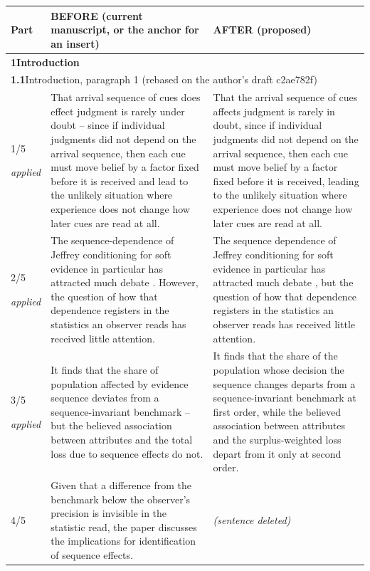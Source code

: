 \documentclass[10pt]{article}
\theoremstyle{definition}
\newcommand{\entryhead}[2]{\multicolumn{3}{|l|}{\rule{0pt}{2.6ex}\large\textbf{#1}\quad #2} \\ \hline}
\begin{document}
{\small
\begin{longtable}{|p{0.9cm}|p{12.2cm}|p{12.2cm}|}
\hline
\textbf{Part} & \textbf{BEFORE (current manuscript, or the anchor for an insert)} & \textbf{AFTER (proposed)} \\ \hline\hline
\endhead
\multicolumn{3}{|l|}{\rule{0pt}{3.2ex}\Large\textbf{1\quad Introduction}} \\ \hline\hline
\entryhead{1.1}{Introduction, paragraph 1 (rebased on the author's draft c2ae782f)\quad{\footnotesize\textit{(formerly C.2)}}}
1/5 \par{\tiny\textit{applied}} & That arrival sequence of cues does effect judgment is rarely under doubt -- since if individual judgments did not depend on the arrival sequence, then each cue must move belief by a factor fixed before it is received and lead to the unlikely situation where experience does not change how later cues are read at all. & That the arrival sequence of cues affects judgment is rarely in doubt, since if individual judgments did not depend on the arrival sequence, then each cue must move belief by a factor fixed before it is received, leading to the unlikely situation where experience does not change how later cues are read at all. \\ \hline
2/5 \par{\tiny\textit{applied}} & The sequence-dependence of Jeffrey conditioning for soft evidence in particular has attracted much debate \citep{DiaconisZabell1982,Hawthorne2004}. However, the question of how that dependence registers in the statistics an observer reads has received little attention. & The sequence dependence of Jeffrey conditioning for soft evidence in particular has attracted much debate \citep{DiaconisZabell1982,Hawthorne2004}, but the question of how that dependence registers in the statistics an observer reads has received little attention. \\ \hline
3/5 \par{\tiny\textit{applied}} & It finds that the share of population affected by evidence sequence deviates from a sequence-invariant benchmark -- but the believed association between attributes and the total loss due to sequence effects do not. & It finds that the share of the population whose decision the sequence changes departs from a sequence-invariant benchmark at first order, while the believed association between attributes and the surplus-weighted loss depart from it only at second order. \\ \hline
4/5 & Given that a difference from the benchmark below the observer's precision is invisible in the statistic read, the paper discusses the implications for identification of sequence effects. & \textit{(sentence deleted)} \\ \hline

\end{longtable}}
\end{document}
